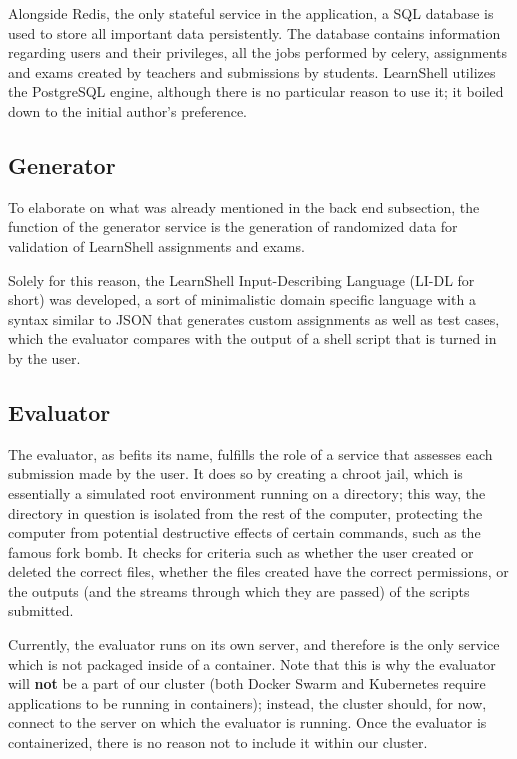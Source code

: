 \documentclass[thesis=B,english]{FITthesis}[2019/12/23]
\begin{document}
Alongside Redis, the only stateful service in the application, a SQL database is used to store all important data persistently. The database contains information regarding users and their privileges, all the jobs performed by celery, assignments and exams created by teachers and submissions by students. LearnShell utilizes the PostgreSQL engine, although there is no particular reason to use it; it boiled down to the initial author's preference.

\subsection{Generator}

To elaborate on what was already mentioned in the back end subsection, the function of the generator service is the generation of randomized data for validation of LearnShell assignments and exams. 

Solely for this reason, the LearnShell Input-Describing Language (LI-DL for short) was developed, a sort of minimalistic domain specific language with a syntax similar to JSON that generates custom assignments as well as test cases, which the evaluator compares with the output of a shell script that is turned in by the user. \cite{learnshell-jilek}  
 
\subsection{Evaluator}

The evaluator, as befits its name, fulfills the role of a service that assesses each submission made by the user. It does so by creating a chroot jail, which is essentially a simulated root environment running on a directory; this way, the directory in question is isolated from the rest of the computer, protecting the computer from potential destructive effects of certain commands, such as the famous fork bomb. \cite{unix-handbook} It checks for criteria such as whether the user created or deleted the correct files, whether the files created have the correct permissions, or the outputs (and the streams through which they are passed) of the scripts submitted.

Currently, the evaluator runs on its own server, and therefore is the only service which is not packaged inside of a container. Note that this is why the evaluator will \textbf{not} be a part of our cluster (both Docker Swarm and Kubernetes require applications to be running in containers); instead, the cluster should, for now, connect to the server on which the evaluator is running. Once the evaluator is containerized, there is no reason not to include it within our cluster.
\end{document}
